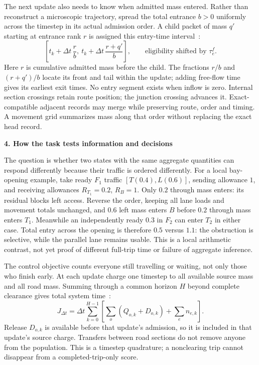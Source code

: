 \documentclass[10pt,a4paper]{article}
\newcommand{\head}[1]{\par\vspace{4pt}\noindent\textbf{#1}\par\nobreak\vspace{1pt}}
\begin{document}
\begin{samepage}
The next update also needs to know when admitted mass entered. Rather
than reconstruct a microscopic trajectory, spread the total entrance
$b>0$ uniformly across the timestep in its actual admission order.
A child packet of mass $q'$ starting at entrance rank $r$ is assigned
this entry-time interval~\cite{m1}:
\begin{equation}
 \left[t_k+\Delta t\,\frac r b,\
       t_k+\Delta t\,\frac{r+q'}b\right],
 \qquad\text{eligibility shifted by }\tau^f_e .
 \label{eq:compact-entry}
\end{equation}
Here $r$ is cumulative admitted mass before the child. The fractions
$r/b$ and $(r+q')/b$ locate its front and tail within the update; adding
free-flow time gives its earliest exit times. No entry segment exists
when inflow is zero. Internal section crossings retain route position;
the junction crossing advances it. Exact-compatible adjacent records
may merge while preserving route, order and timing. A movement grid
summarizes mass along that order without replacing the exact head record.
\par\end{samepage}

\head{4. How the task tests information and decisions}
The question is whether two states with the same aggregate quantities
can respond differently because their traffic is ordered differently.
For a local bay-opening example, take ready $F_1$ traffic
$[T(0.4),L(0.6)]$, sending allowance $1$, and receiving allowances
$R_{T_1}=0.2$, $R_B=1$. Only $0.2$ through mass enters: its residual
blocks left access. Reverse the order, keeping all lane loads and
movement totals unchanged, and $0.6$ left mass enters $B$ before $0.2$
through mass enters $T_1$. Meanwhile an independently ready $0.3$ in
$F_2$ can enter $T_2$ in either case. Total entry across the opening is
therefore $0.5$ versus $1.1$: the obstruction is selective, while the
parallel lane remains usable. This is a local arithmetic contrast,
not yet proof of different full-trip time or failure of aggregate inference.

The control objective counts everyone still travelling or waiting, not
only those who finish early. At each update charge one timestep to all
available source mass and all road mass. Summing through a common
horizon $H$ beyond complete clearance gives total system time~\cite{m0}:
\begin{equation}
 J_{\Delta t}
 =\Delta t\sum_{k=0}^{H-1}
 \left[\sum_o(Q_{o,k}+D_{o,k})+\sum_en_{e,k}\right].
 \label{eq:compact-tst}
\end{equation}
Release $D_{o,k}$ is available before that update's admission, so it is
included in that update's source charge. Transfers between road sections
do not remove anyone from the population. This is a timestep quadrature;
a nonclearing trip cannot disappear from a completed-trip-only score.
\end{document}
